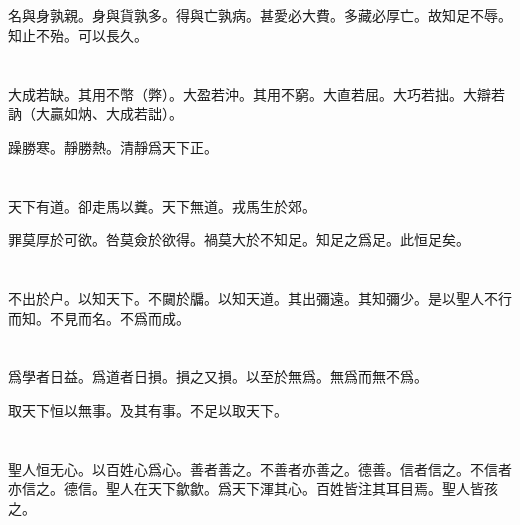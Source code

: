 \documentclass[a5paper]{ctexbook}
\begin{document}
    \chapter{}

    名與身孰親。身與貨孰多。得與亡孰病。甚愛必大費。多藏必厚亡。故知足不辱。知止不殆。可以長久。

    \chapter{}

    大成若缺。其用不幣（弊）。大盈若沖。其用不窮。大直若屈。大巧若拙。大辯若訥（大贏如㶧、大成若詘）。

    躁勝寒。靜勝熱。清靜爲天下正。

    \chapter{}

    天下有道。卻走馬以糞。天下無道。戎馬生於郊。
    
    罪莫厚於可欲。咎莫僉於欲得。禍莫大於不知足。知足之爲足。此恒足矣。

    \chapter{}

    不出於户。以知天下。不闚於牖。以知天道。其出彌遠。其知彌少。是以聖人不行而知。不見而名。不爲而成。

    \chapter{}

    爲學者日益。爲道者日損。損之又損。以至於無爲。無爲而無不爲。
    
    取天下恒以無事。及其有事。不足以取天下。

    \chapter{}

    聖人恒无心。以百姓心爲心。善者善之。不善者亦善之。德善。信者信之。不信者亦信之。德信。聖人在天下歙歙。爲天下渾其心。百姓皆注其耳目焉。聖人皆孩之。

    \chapter{}
\end{document}
